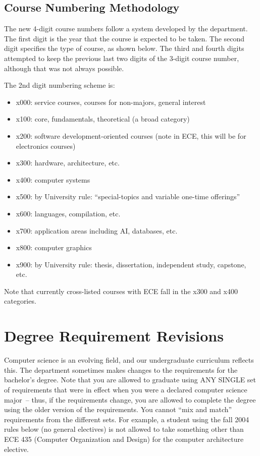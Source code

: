 \documentclass[10pt,letter]{book}
\newenvironment{itemlist}{
\begin{itemize}
\setlength{\itemsep}{0pt}
\setlength{\parskip}{0pt}}
{\end{itemize}}
\newcommand{\mysection}[1]{\section{#1}\renewcommand{\rightmark}{#1}}
\begin{document}
\subsection{Course Numbering Methodology}

The new 4-digit course numbers follow a system developed by the
department. The first digit is the year that the course is expected
to be taken. The second digit specifies the type of course, as shown
below. The third and fourth digits attempted to keep the previous
last two digits of the 3-digit course number, although that was not
always possible. 


The 2nd digit numbering scheme is:

\begin{itemlist}
\item x000: service courses, courses for non-majors, general interest
\item x100: core, fundamentals, theoretical (a broad category)
\item x200: software development-oriented courses (note in ECE, this will
 be for electronics courses)
\item x300: hardware, architecture, etc.
\item x400: computer systems
\item x500: by University rule: ``special-topics and variable one-time
 offerings''
\item x600: languages, compilation, etc.
\item x700: application areas including AI, databases, etc.
\item x800: computer graphics
\item x900: by University rule: thesis, dissertation, independent
 study, capstone, etc.
\end{itemlist}

Note that currently cross-listed courses with ECE fall in the x300 and
x400 categories.

\mysection{Degree Requirement Revisions}
\label{sec:degreerevisions}

Computer science is an evolving field, and our undergraduate
curriculum reflects this. The department sometimes makes changes to
the requirements for the bachelor's degree. Note that you are allowed
to graduate using ANY SINGLE set of requirements that were in effect
when you were a declared computer science major~-- thus, if the
requirements change, you are allowed to complete the degree using the
older version of the requirements. You cannot ``mix and match''
requirements from the different sets. For example, a student using the
fall 2004 rules below (no general electives) is not allowed to take
something other than ECE 435 (Computer Organization and Design) for
the computer architecture elective. 
\end{document}
